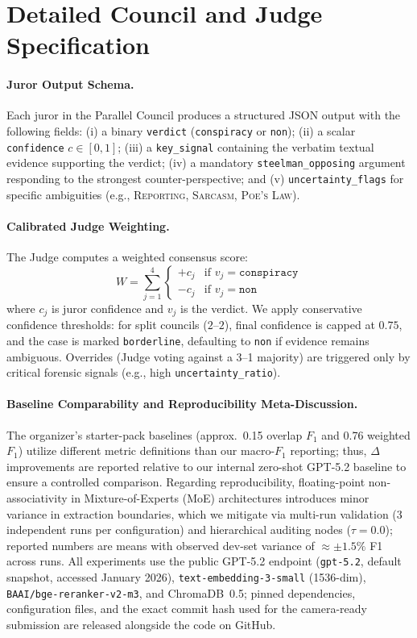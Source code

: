 \documentclass[11pt]{article}
\begin{document}
\section{Detailed Council and Judge Specification}
\label{app:council-details}

\paragraph{Juror Output Schema.} Each juror in the Parallel Council produces a structured JSON output with the
following fields: (i) a binary \texttt{verdict} (\texttt{conspiracy} or
\texttt{non}); (ii) a scalar \texttt{confidence} $c \in [0,1]$; (iii) a
\texttt{key\_signal} containing the verbatim textual evidence supporting the
verdict; (iv) a mandatory \texttt{steelman\_opposing} argument responding to
the strongest counter-perspective; and (v) \texttt{uncertainty\_flags} for
specific ambiguities (e.g., \textsc{Reporting}, \textsc{Sarcasm}, \textsc{Poe's
	Law}).

\paragraph{Calibrated Judge Weighting.} The Judge computes a weighted consensus score:
\[ W = \sum_{j=1}^{4} \begin{cases} +c_j & \text{if } v_j = \texttt{conspiracy} \\ -c_j & \text{if } v_j = \texttt{non} \end{cases} \]
where $c_j$ is juror confidence and $v_j$ is the verdict. We apply conservative
confidence thresholds: for split councils ($2$--$2$), final confidence is
capped at $0.75$, and the case is marked \texttt{borderline}, defaulting to
\texttt{non} if evidence remains ambiguous. Overrides (Judge voting against a
3--1 majority) are triggered only by critical forensic signals (e.g., high
\texttt{uncertainty\_ratio}).

\paragraph{Baseline Comparability and Reproducibility Meta-Discussion.}
\label{app:exp-meta}
The organizer's starter-pack baselines (approx.\ 0.15 overlap $F_1$ and 0.76 weighted $F_1$) utilize different metric definitions than our macro-$F_1$ reporting; thus, $\Delta$ improvements are reported relative to our internal zero-shot GPT-5.2 baseline to ensure a controlled comparison. Regarding reproducibility, floating-point non-associativity in Mixture-of-Experts (MoE) architectures \cite{thinkingmachines_nondeterminism} introduces minor variance in extraction boundaries, which we mitigate via multi-run validation (3 independent runs per configuration) and hierarchical auditing nodes ($\tau=0.0$); reported numbers are means with observed dev-set variance of $\approx \pm 1.5\%$ F1 across runs. All experiments use the public GPT-5.2 endpoint (\texttt{gpt-5.2}, default snapshot, accessed January 2026), \texttt{text-embedding-3-small} (1536-dim), \texttt{BAAI/bge-reranker-v2-m3}, and ChromaDB~0.5; pinned dependencies, configuration files, and the exact commit hash used for the camera-ready submission are released alongside the code on GitHub.
\end{document}
